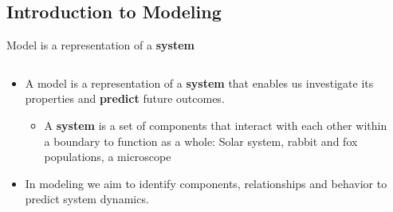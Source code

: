 \subsection{Introduction to Modeling}
\begin{frame}[t]{Model is a representation of a \textbf{system}}
\small
 \begin{columns}
 \begin{column}{0.65\textwidth}
     \begin{itemize}
    \item    A model is a representation of a \textbf{system} that enables us investigate its properties and \textbf{predict} future outcomes.
    \begin{itemize}
           \item    A \textbf{system} is  a set of components  that interact with each other within a boundary to function as a whole: Solar system, rabbit and fox populations, a microscope
           
       \end{itemize}
    \item In modeling we aim to identify components, relationships and behavior to predict system dynamics.
    \end{itemize}
 \end{column}

 \begin{column}{0.35\textwidth}
 \color{primary}


\end{column}
\end{columns}
\end{frame}
